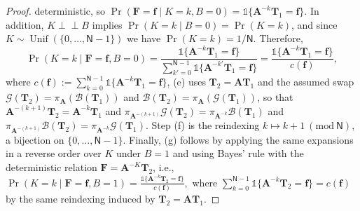 \documentclass[onecolumn]{IEEEtran} %
\newcommand{\bA}{\mathbf A}
\newcommand{\bF}{\mathbf F}
\newcommand{\1}{\mathbbm{1}}
\theoremstyle{boldremark}
\newcommand{\bT}{\mathbf{T}}
\DeclareMathOperator{\Unif}{Unif}
\newcommand{\pperp}{\mathrel{\perp\!\!\!\perp}}
\begin{document}
\begin{proof}
deterministic, so $\Pr(\bF=\mathbf f\mid K=k,B=0)=\mathds{1}\{\bA^{-k}\bT_1=\mathbf f\}.$ In addition, $K\pperp B$ implies $\Pr(K=k\mid B=0)=\Pr(K=k)$, and since $K\sim\Unif(\{0,\dots,\textsf{N}-1\})$ we have $\Pr(K=k)=1/\textsf{N}$.
Therefore,
\[
\Pr(K=k\mid \bF=\mathbf f,B=0)
=\frac{\mathds{1}\{\bA^{-k}\bT_1=\mathbf f\}}
        {\sum_{k'=0}^{\textsf{N}-1}\mathds{1}\{\bA^{-k'}\bT_1=\mathbf f\}}
=\frac{\mathds{1}\{\bA^{-k}\bT_1=\mathbf f\}}{c(\mathbf f)},
\]
where $c(\mathbf f):=\sum_{k=0}^{\textsf{N}-1}\mathds{1}\{\bA^{-k}\bT_1=\mathbf f\}$,
 (e) uses $\bT_2=\bA\bT_1$ and the assumed swap
$\mathcal G(\bT_2)=\pi_{\bA}(\mathcal B(\bT_1))$ and $\mathcal B(\bT_2)=\pi_{\bA}(\mathcal G(\bT_1))$,
so that $\bA^{-(k+1)}\bT_2=\bA^{-k}\bT_1$ and
$\pi_{\bA^{-(k+1)}}\mathcal G(\bT_2)=\pi_{\bA^{-k}}\mathcal B(\bT_1)$ and
$\pi_{\bA^{-(k+1)}}\mathcal B(\bT_2)=\pi_{\bA^{-k}}\mathcal G(\bT_1)$.
Step (f) is the reindexing $k\mapsto k+1\ (\mathrm{mod}\ \textsf{N})$, a bijection on $\{0,\dots,\textsf{N}-1\}$.
Finally, (g) follows by applying the same expansions in a reverse order over $K$ under $B=1$ and
using Bayes' rule with the deterministic relation $\bF=\bA^{-K}\bT_2$, i.e.,
$\Pr(K=k\mid \bF=\mathbf f,B=1)=\frac{\mathds{1}\{\bA^{-k}\bT_2=\mathbf f\}}{c(\mathbf f)},$
where $\sum_{k=0}^{\textsf{N}-1}\mathds{1}\{\bA^{-k}\bT_2=\mathbf f\}=c(\mathbf f)$ by the same reindexing induced by $\bT_2=\bA\bT_1$. 



\end{proof}
\end{document}
